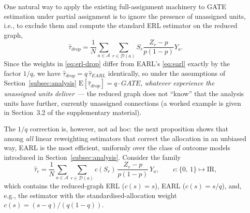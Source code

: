 \documentclass[sigconf,anonymous,review]{acmart}
\newcounter{assumption}
\newcommand{\E}{\mathrm E}
\newcommand{\R}{\mathrm{I}\!\mathrm{R}}
\begin{document}
One natural way to apply the existing full-assignment machinery to GATE estimation under partial assignment is to ignore the presence of unassigned units, i.e., to exclude them and compute the standard ERL estimator \cite{harshaw2023erl} on the reduced graph,
\begin{equation}\label{eq:erl-drop}
    \hat \tau_{drop} = \frac 1 N \sum_{a\in\mathcal{A}}\sum_{r\in\mathcal{D}(a)}S_r\frac{Z_r-p}{p(1-p)}Y_a.
\end{equation}
Since the weights in \eqref{eq:erl-drop} differ from EARL's \eqref{eq:earl} exactly by the factor $1/q$, we have $\hat\tau_{drop} = q\,\hat\tau_{EARL}$ identically, so under the assumptions of Section~\ref{subsec:analysis} $\E[\hat\tau_{drop}] = q\cdot GATE$, \emph{whatever experience the unassigned units deliver}~--- the reduced graph does not ``know'' that the analysis units have further, currently unassigned connections (a worked example is given in Section~3.2 of the supplementary material).

The $1/q$ correction is, however, not ad hoc: the next proposition shows that among \emph{all} linear reweighting estimators that correct the allocation in an unbiased way, EARL is the most efficient, uniformly over the class of outcome models introduced in Section~\ref{subsec:analysis}. Consider the family
\begin{equation}\label{eq:class}
    \hat\tau_{c} = \frac 1 N \sum_{a\in \mathcal A} \sum_{r\in\mathcal{D}(a)}c(S_r)\,\frac{Z_r - p}{p(1-p)}\, Y_a,\qquad c\colon\{0,\,1\}\mapsto\R,
\end{equation}
which contains the reduced-graph ERL ($c(s)=s$), EARL ($c(s)=s/q$), and, e.g., the estimator with the standardised-allocation weight $c(s)=(s-q)/(q(1-q))$.
\end{document}
